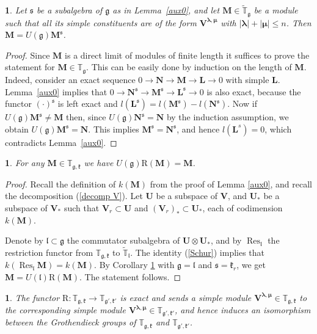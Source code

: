 \documentclass[12pt,oneside,english]{amsart}
\numberwithin{equation}{section}
\numberwithin{figure}{section}
\theoremstyle{plain}
\theoremstyle{plain}
\newtheorem{lem}[thm]{\protect\lemmaname}
\theoremstyle{remark}
\theoremstyle{definition}
\theoremstyle{plain}
\theoremstyle{remark}
\theoremstyle{definition}
\theoremstyle{plain}
\newtheorem{cor}[thm]{\protect\corollaryname}
\theoremstyle{plain}
\theoremstyle{definition}
\providecommand{\corollaryname}{Corollary}
\providecommand{\lemmaname}{Lemma}
\newcommand{\bV}{\mathbf{V}}
\newcommand{\bL}{\mathbf{L}}
\newcommand{\bM}{\mathbf{M}}
\newcommand{\bN}{\mathbf{N}}
\newcommand{\bU}{\mathbf{U}}
\newcommand{\fg}{\mathfrak{g}}
\newcommand{\fl}{\mathfrak{l}}
\newcommand{\fk}{\mathfrak{k}}
\newcommand{\fs}{\mathfrak{s}}
\begin{document}
\begin{cor}\label{cor:gen}  Let $\fs$ be a subalgebra of $\fg$ as in Lemma~\ref{aux0}, and let $\bM\in\widetilde{\mathbb T}_{\fg}$ be a module such that all its
  simple constituents are of the form
  $\bV^{\boldsymbol{\lambda},{\boldsymbol{\mu}}}$ with $|\boldsymbol{\lambda}|+|{\boldsymbol{\mu}}|\leq n$. Then $\bM=U(\fg)\bM^{\fs}$.
\end{cor}
\begin{proof} Since $\bM$ is a direct limit of modules of finite length it suffices to prove the statement for $\bM\in\mathbb{T}_{\fg}$. This can be easily done
  by induction on the length of $\bM$. Indeed, consider an exact sequence
  $0\to \bN\to \bM\to \bL\to 0$ with simple $\bL$. Lemma~\ref{aux0} implies that $0\to \bN^{\fs}\to \bM^{\fs}\to \bL^{\fs}\to 0$ is also exact, because the functor $(\cdot)^\fs$ is left exact and $l(\bL^{\fs})=l(\bM^{\fs})-l(\bN^{\fs})$. Now if $U(\fg)\bM^{\fs}\neq \bM$ then, since $U(\fg)\bN^{\fs}=\bN$ by the induction assumption, we obtain
  $U(\fg)\bM^{\fs}=\bN$. This implies $\bM^{\fs}=\bN^{\fs}$, and hence $l(\bL^s)=0$, which contradicts Lemma~\ref{aux0}.
  \end{proof}

  \begin{lem}\label{aux1} For any $\bM\in\mathbb T_{\fg,\fk}$ we have $U(\fg)\mathrm{R}(\bM)=\bM$.
  \end{lem}
  \begin{proof} Recall the definition of $k(\bM)$ from the proof of Lemma \ref{aux0}, and recall the decomposition (\ref{decomp V}).  Let $\bU$ be a subspace of $\bV$, and  $\bU_*$ be a subspace of $\bV_*$ such that  $\bV_r\subset\bU$  and  $(\bV_r)_*\subset\bU_*$, each of codimension $k(\bM)$.


Denote by $\fl\subset\fg$ the commutator subalgebra of  $\bU\otimes\bU_*$, and by $\operatorname{Res}_{\fl}$ the restriction functor from $\mathbb T_{\fg,\fk}$ to $\widetilde{\mathbb T}_{\fl}$. The identity (\ref{Schur}) implies that
    $k(\operatorname{Res}_{\fl}\bM)=k(\bM)$. By Corollary \ref{cor:gen} with $\fg=\fl$ and $\fs=\fk_r$, we get $\bM=U(\fl)\mathrm{R}(\bM)$. The statement follows.
\end{proof}

\begin{lem}\label{lem: R2} The functor $\mathrm{R}:\mathbb T_{\fg,\fk}\to \mathbb T_{\fg',\fk'}$ is exact and sends a simple module
  $\bV^{\boldsymbol{\lambda},{\boldsymbol{\mu}}}\in\mathbb T_{\fg,\fk}$ to the corresponding simple module $\bV^{\boldsymbol{\lambda},{\boldsymbol{\mu}}}\in\mathbb T_{\fg',\fk'}$, and hence induces an isomorphism between the
Grothendieck groups of $\mathbb T_{\fg,\fk}$ and $\mathbb T_{\fg',\fk'}$.
\end{lem}
\end{document}
